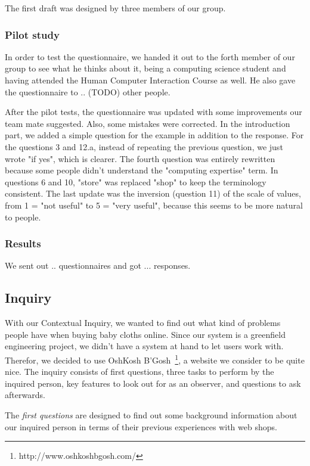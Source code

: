 The first draft was designed by three members of our group.

\subsubsection{Pilot study}
In order to test the questionnaire, we handed it out to the forth member of our group to see what he thinks about it, being a computing science student and having attended the Human Computer Interaction Course as well. He also gave the questionnaire to .. (TODO) other people.

After the pilot tests, the questionnaire was updated with some improvements our team mate suggested. Also, some mistakes were corrected. In the introduction part, we added a simple question for the example in addition to the response. For the questions 3 and 12.a, instead of repeating the previous question, we just wrote "if yes", which is clearer. The fourth question was entirely rewritten because some people didn't understand the "computing expertise" term. In questions 6 and 10, "store" was replaced "shop" to keep the terminology consistent. The last update was the inversion (question 11) of the scale of values, from 1 = "not useful" to 5 = "very useful", because this seems to be more natural to people.

\subsubsection{Results}
We sent out .. questionnaires and got ... responses.


\subsection{Inquiry}
With our Contextual Inquiry, we wanted to find out what kind of problems people have when buying baby cloths online. Since our system is a greenfield engineering project, we didn't have a system at hand to let users work with. Therefor, we decided to use OshKosh B'Gosh~\footnote{http://www.oshkoshbgosh.com/}, a website we consider to be quite nice.
The inquiry consists of first questions, three tasks to perform by the inquired person, key features to look out for as an observer, and questions to ask afterwards.

The \textit{first questions} are designed to find out some background information about our inquired person in terms of their previous experiences with web shops. 

